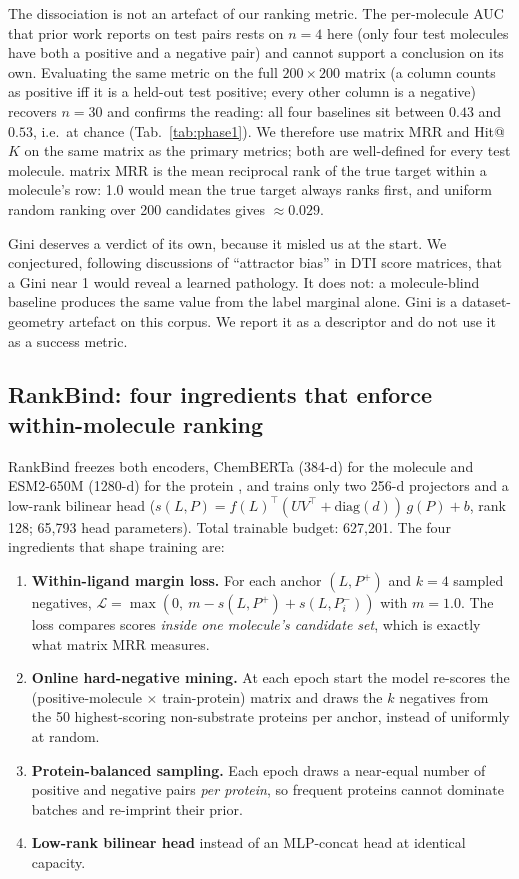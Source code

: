 \documentclass[11pt,a4paper]{article}
\newcommand{\method}{RankBind\xspace}
\newcommand{\mrr}{matrix MRR}
\begin{document}
The dissociation is not an artefact of our ranking metric. The per-molecule
AUC that prior work reports on test pairs rests on $n=4$ here (only four
test molecules have both a positive and a negative pair) and cannot support
a conclusion on its own. Evaluating the same metric on the full
$200\times200$ matrix (a column counts as positive iff it is a held-out test
positive; every other column is a negative) recovers $n=30$ and confirms the
reading: all four baselines sit between $0.43$ and $0.53$, i.e.\ at chance
(Tab.~\ref{tab:phase1}). We therefore use \mrr{} and Hit@$K$ on the same
matrix as the primary metrics; both are well-defined for every test
molecule. \mrr{} is the mean reciprocal rank of the true target within a
molecule's row: 1.0 would mean the true target always ranks first, and
uniform random ranking over 200 candidates gives $\approx 0.029$.

Gini deserves a verdict of its own, because it misled us at the start. We
conjectured, following discussions of ``attractor bias'' in DTI score
matrices, that a Gini near 1 would reveal a learned pathology. It does not:
a molecule-blind baseline produces the same value from the label marginal
alone. Gini is a dataset-geometry artefact on this corpus. We report it as a
descriptor and do not use it as a success metric.

\subsection{\method: four ingredients that enforce within-molecule ranking}
\label{sec:method}

\method{} freezes both encoders, ChemBERTa (384-d) for the molecule
\citep{chithrananda2020chemberta} and ESM2-650M (1280-d) for the protein
\citep{lin2023esm2}, and trains only two 256-d projectors and a low-rank
bilinear head
($s(L,P) = f(L)^\top (UV^\top + \mathrm{diag}(d))\, g(P) + b$, rank 128;
65{,}793 head parameters). Total trainable budget: 627{,}201. The four
ingredients that shape training are:

\begin{enumerate}[leftmargin=*,itemsep=1pt,topsep=2pt]
  \item \textbf{Within-ligand margin loss.} For each anchor $(L, P^+)$ and
        $k=4$ sampled negatives,
        $\mathcal{L} = \max(0,\ m - s(L,P^+) + s(L,P^-_i))$ with $m=1.0$.
        The loss compares scores \emph{inside one molecule's candidate
        set}, which is exactly what \mrr{} measures.
  \item \textbf{Online hard-negative mining.} At each epoch start the model
        re-scores the (positive-molecule $\times$ train-protein) matrix and
        draws the $k$ negatives from the 50 highest-scoring non-substrate
        proteins per anchor, instead of uniformly at random.
  \item \textbf{Protein-balanced sampling.} Each epoch draws a near-equal
        number of positive and negative pairs \emph{per protein}, so
        frequent proteins cannot dominate batches and re-imprint their
        prior.
  \item \textbf{Low-rank bilinear head} instead of an MLP-concat head at
        identical capacity.
\end{enumerate}
\end{document}
